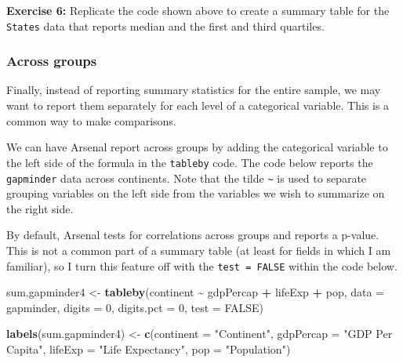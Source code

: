 \documentclass[
]{book}
\makeatletter
\newenvironment{Shaded}{\begin{snugshade}}{\end{snugshade}}
\newcommand{\AttributeTok}[1]{\textcolor[rgb]{0.27,0.27,0.27}{#1}}
\newcommand{\ConstantTok}[1]{\textcolor[rgb]{0.37,0.37,0.37}{#1}}
\newcommand{\DecValTok}[1]{\textcolor[rgb]{0.06,0.06,0.06}{#1}}
\newcommand{\FunctionTok}[1]{\textcolor[rgb]{0.27,0.27,0.27}{\textbf{#1}}}
\newcommand{\NormalTok}[1]{#1}
\newcommand{\OtherTok}[1]{\textcolor[rgb]{0.37,0.37,0.37}{#1}}
\newcommand{\SpecialCharTok}[1]{\textcolor[rgb]{0.43,0.43,0.43}{\textbf{#1}}}
\newcommand{\StringTok}[1]{\textcolor[rgb]{0.5,0.5,0.5}{#1}}
\newenvironment{kframe}{%
\medskip{}
\setlength{\fboxsep}{.8em}
 \def\at@end@of@kframe{}%
 \ifinner\ifhmode%
  \def\at@end@of@kframe{\end{minipage}}%
  \begin{minipage}{\columnwidth}%
 \fi\fi%
 \def\FrameCommand##1{\hskip\@totalleftmargin \hskip-\fboxsep
 \colorbox{shadecolor}{##1}\hskip-\fboxsep
     \hskip-\linewidth \hskip-\@totalleftmargin \hskip\columnwidth}%
 \MakeFramed {\advance\hsize-\width
   \@totalleftmargin\z@ \linewidth\hsize
   \@setminipage}}%
 {\par\unskip\endMakeFramed%
 \at@end@of@kframe}
\renewenvironment{Shaded}{\begin{kframe}}{\end{kframe}}
\newenvironment{rmdblock}[1]
  {\begin{shaded*}
  }
  {\end{shaded*}
  }
\newenvironment{learncheck}
  {\begin{rmdblock}{warning}}
  {\end{rmdblock}}
\makeatother
\begin{document}
\begin{learncheck}
\textbf{Exercise 6:} Replicate the code shown above to create a summary
table for the \texttt{States} data that reports median and the first and
third quartiles.
\end{learncheck}

\hypertarget{across-groups}{%
\subsubsection{Across groups}\label{across-groups}}

Finally, instead of reporting summary statistics for the entire sample, we may want to report them separately for each level of a categorical variable. This is a common way to make comparisons.

We can have Arsenal report across groups by adding the categorical variable to the left side of the formula in the \texttt{tableby} code. The code below reports the \texttt{gapminder} data across continents. Note that the tilde \texttt{\textasciitilde{}} is used to separate grouping variables on the left side from the variables we wish to summarize on the right side.

By default, Arsenal tests for correlations across groups and reports a p-value. This is not a common part of a summary table (at least for fields in which I am familiar), so I turn this feature off with the \texttt{test\ =\ FALSE} within the code below.

\begin{Shaded}
\begin{Highlighting}[]
\NormalTok{sum.gapminder4 }\OtherTok{\textless{}{-}} \FunctionTok{tableby}\NormalTok{(continent }\SpecialCharTok{\textasciitilde{}}\NormalTok{ gdpPercap }\SpecialCharTok{+}\NormalTok{ lifeExp }\SpecialCharTok{+}\NormalTok{ pop, }\AttributeTok{data =}\NormalTok{ gapminder, }\AttributeTok{digits =} \DecValTok{0}\NormalTok{, }\AttributeTok{digits.pct =} \DecValTok{0}\NormalTok{, }\AttributeTok{test =} \ConstantTok{FALSE}\NormalTok{)}

\FunctionTok{labels}\NormalTok{(sum.gapminder4) }\OtherTok{\textless{}{-}} \FunctionTok{c}\NormalTok{(}\AttributeTok{continent =} \StringTok{"Continent"}\NormalTok{, }\AttributeTok{gdpPercap =} \StringTok{"GDP Per Capita"}\NormalTok{, }\AttributeTok{lifeExp =} \StringTok{"Life Expectancy"}\NormalTok{, }\AttributeTok{pop =} \StringTok{"Population"}\NormalTok{)}
\end{Highlighting}
\end{Shaded}
\end{document}
